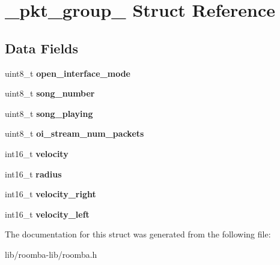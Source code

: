 \hypertarget{struct__pkt__group__5}{}\section{\+\_\+pkt\+\_\+group\+\_ Struct Reference}
\label{struct__pkt__group__5}
\subsection*{Data Fields}
\begin{DoxyCompactItemize}
\item 
\hypertarget{group__roomba-lib_ga95f014b775e0a88146275cc8c02fd0a6}{}uint8\+\_\+t {\bfseries open\+\_\+interface\+\_\+mode}\label{group__roomba-lib_ga95f014b775e0a88146275cc8c02fd0a6}

\item 
\hypertarget{group__roomba-lib_gaa6217d6706245d585e199f0f68a267e6}{}uint8\+\_\+t {\bfseries song\+\_\+number}\label{group__roomba-lib_gaa6217d6706245d585e199f0f68a267e6}

\item 
\hypertarget{group__roomba-lib_gaef36cb1a116e22e532a0bb1749b613cd}{}uint8\+\_\+t {\bfseries song\+\_\+playing}\label{group__roomba-lib_gaef36cb1a116e22e532a0bb1749b613cd}

\item 
\hypertarget{group__roomba-lib_gab222e529ead66fbcc944874273461685}{}uint8\+\_\+t {\bfseries oi\+\_\+stream\+\_\+num\+\_\+packets}\label{group__roomba-lib_gab222e529ead66fbcc944874273461685}

\item 
\hypertarget{group__roomba-lib_ga467761ebc543ee859377b24c2753bb07}{}int16\+\_\+t {\bfseries velocity}\label{group__roomba-lib_ga467761ebc543ee859377b24c2753bb07}

\item 
\hypertarget{group__roomba-lib_gaaea9910e6bafda799f0b50dcfe30fd67}{}int16\+\_\+t {\bfseries radius}\label{group__roomba-lib_gaaea9910e6bafda799f0b50dcfe30fd67}

\item 
\hypertarget{group__roomba-lib_ga521639ee0605d21dd4a3003e41ccb9fc}{}int16\+\_\+t {\bfseries velocity\+\_\+right}\label{group__roomba-lib_ga521639ee0605d21dd4a3003e41ccb9fc}

\item 
\hypertarget{group__roomba-lib_gaf43d79ba2a8a202a6cba221a59f38e4e}{}int16\+\_\+t {\bfseries velocity\+\_\+left}\label{group__roomba-lib_gaf43d79ba2a8a202a6cba221a59f38e4e}

\end{DoxyCompactItemize}


The documentation for this struct was generated from the following file\+:\begin{DoxyCompactItemize}
\item 
lib/roomba-\/lib/roomba.\+h\end{DoxyCompactItemize}

